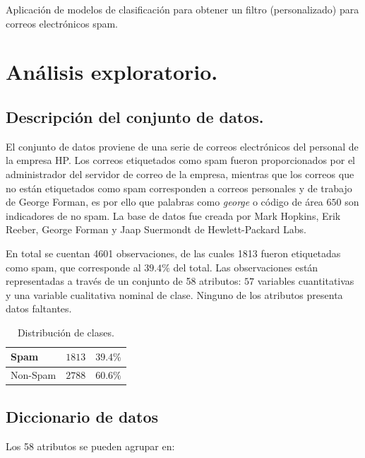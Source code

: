 \documentclass[12pt, letterpaper]{article}
\begin{document}
Aplicación de modelos de clasificación para obtener un filtro (personalizado) para correos electrónicos spam.

\section{Análisis exploratorio.}

\subsection{Descripción del conjunto de datos.}

El conjunto de datos proviene de una serie de correos electrónicos del personal de la empresa HP. Los correos etiquetados como spam fueron proporcionados por el administrador del servidor de correo de la empresa, mientras que los correos que no están etiquetados como spam corresponden a correos personales y de trabajo de George Forman, es por ello que palabras como \textit{george} o código de área $650$ son indicadores de no spam. La base de datos fue creada por Mark Hopkins, Erik Reeber, George Forman y Jaap Suermondt de Hewlett-Packard Labs.

En total se cuentan 4601 observaciones, de las cuales 1813 fueron etiquetadas como spam, que corresponde al $39.4\%$ del total. Las observaciones están representadas a través de un conjunto de 58 atributos: $57$ variables cuantitativas y una variable cualitativa nominal de clase. Ninguno de los atributos presenta datos faltantes. 

\begin{table}[ht]
\centering
\begin{tabular}{|l|l|l|}
\hline
Spam     & $1813$ & $39.4 \%$ \\ \hline
Non-Spam & $2788$ & $60.6 \%$ \\ \hline
\end{tabular}
\caption{Distribución de clases.}
\label{t_dist}
\end{table}

\subsection{Diccionario de datos}

Los 58 atributos se pueden agrupar en:
\end{document}
